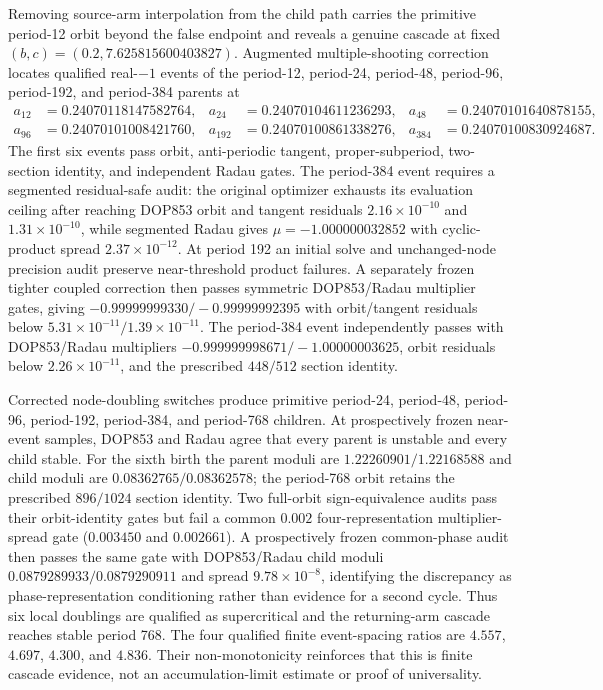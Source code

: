 Removing source-arm interpolation from the child path carries the primitive
period-12 orbit beyond the false endpoint and reveals a genuine cascade at
fixed $(b,c)=(0.2,7.625815600403827)$. Augmented multiple-shooting correction
locates qualified real-$-1$ events of the period-12, period-24, period-48,
period-96, period-192, and period-384 parents at
\begin{align}
 a_{12}&=0.24070118147582764,&
 a_{24}&=0.24070104611236293,&
 a_{48}&=0.24070101640878155,\\
 a_{96}&=0.24070101008421760,&
 a_{192}&=0.24070100861338276,&
 a_{384}&=0.24070100830924687.&&
\end{align}
The first six events pass orbit, anti-periodic tangent, proper-subperiod,
two-section identity, and independent Radau gates. The period-384 event requires a
segmented residual-safe audit: the original optimizer exhausts its evaluation
ceiling after reaching DOP853 orbit and tangent residuals
$2.16\times10^{-10}$ and $1.31\times10^{-10}$, while segmented Radau gives
$\mu=-1.000000032852$ with cyclic-product spread $2.37\times10^{-12}$.
At period 192 an initial solve and unchanged-node precision audit preserve
near-threshold product failures. A separately frozen tighter coupled
correction then passes symmetric DOP853/Radau multiplier gates, giving
$-0.99999999330/-0.99999992395$ with orbit/tangent residuals below
$5.31\times10^{-11}/1.39\times10^{-11}$. The period-384 event independently
passes with DOP853/Radau multipliers
$-0.999999998671/-1.00000003625$, orbit residuals below
$2.26\times10^{-11}$, and the prescribed $448/512$ section identity.

Corrected node-doubling switches produce primitive period-24, period-48,
period-96, period-192, period-384, and period-768 children. At prospectively frozen
near-event samples, DOP853 and
Radau agree that every parent is unstable and every child stable. For the
sixth birth the parent moduli are $1.22260901/1.22168588$ and child moduli are
$0.08362765/0.08362578$; the period-768 orbit retains the prescribed $896/1024$ section
identity. Two full-orbit sign-equivalence audits pass their orbit-identity
gates but fail a common $0.002$ four-representation multiplier-spread gate
($0.003450$ and $0.002661$). A prospectively frozen common-phase audit then
passes the same gate with DOP853/Radau child moduli
$0.0879289933/0.0879290911$ and spread $9.78\times10^{-8}$, identifying the
discrepancy as phase-representation conditioning rather than evidence for a
second cycle. Thus six local doublings are qualified as supercritical and the
returning-arm cascade reaches stable period 768. The four qualified finite
event-spacing ratios are $4.557$, $4.697$, $4.300$, and $4.836$. Their
non-monotonicity reinforces
that this is finite cascade evidence, not an accumulation-limit estimate or
proof of universality.

